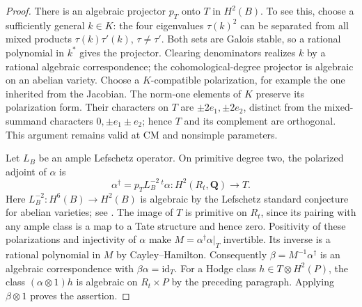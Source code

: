 \documentclass[11pt,reqno]{article}
\theoremstyle{emphasizedplain}
\theoremstyle{emphasizeddefinition}
\theoremstyle{emphasizeddefinition}
\newcommand{\Q}{\mathbf Q}
\begin{document}
\begin{proof}
There is an algebraic projector $p_T$ onto $T$ in $H^2(B)$.
To see this, choose a sufficiently general $k\in K$: the four
eigenvalues $\tau(k)^2$ can be separated from all mixed products
$\tau(k)\tau'(k)$, $\tau\ne\tau'$. Both sets are Galois stable,
so a rational polynomial in $k^*$ gives the projector. Clearing
denominators realizes $k$ by a rational algebraic correspondence;
the cohomological-degree projector is algebraic on an abelian variety.
Choose a $K$-compatible polarization, for example the one inherited
from the Jacobian. The norm-one elements of $K$ preserve its
polarization form. Their characters on $T$ are
$\pm2e_1,\pm2e_2$, distinct from the mixed-summand characters
$0,\pm e_1\pm e_2$; hence $T$ and its complement are orthogonal.
This argument remains valid at CM and nonsimple parameters.

Let $L_B$ be an ample Lefschetz operator. On primitive degree two,
the polarized adjoint of $\alpha$ is
\[
 \alpha^\dagger=p_T L_B^{-2}\,{}^t\!\alpha:
 H^2(R_t,\Q)\longrightarrow T.
\]
Here $L_B^{-2}:H^6(B)\to H^2(B)$ is algebraic by the Lefschetz
standard conjecture for abelian varieties; see
\cite[\S5]{MilneLefschetz}. The image of $T$ is
primitive on $R_t$, since its pairing with any ample class is a
map to a Tate structure and hence zero. Positivity of these
polarizations and injectivity of $\alpha$ make
$M=\alpha^\dagger\alpha|_T$ invertible. Its inverse is a rational
polynomial in $M$ by Cayley--Hamilton. Consequently
$\beta=M^{-1}\alpha^\dagger$ is an algebraic correspondence with
$\beta\alpha=\mathrm{id}_T$.
For a Hodge class $h\in T\otimes H^2(P)$, the class
$(\alpha\otimes1)h$ is algebraic on $R_t\times P$ by the preceding
paragraph. Applying $\beta\otimes1$ proves the assertion.
\end{proof}
\end{document}
